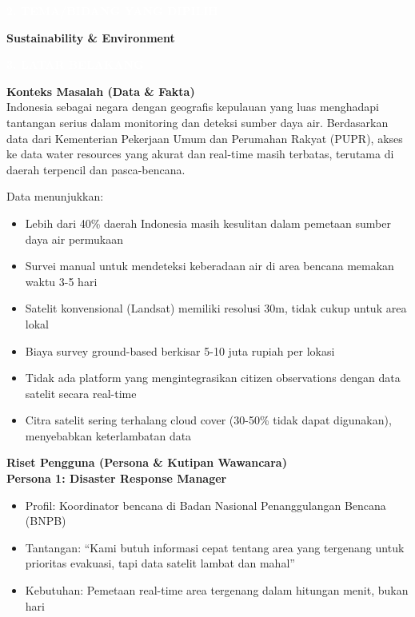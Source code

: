 \documentclass[12pt,a4paper]{article}
\newcommand{\sectionbox}[1]{%
  \colorbox{samsungblue}{%
    \parbox{\textwidth}{%
      \textcolor{white}{\large\bfseries #1}%
    }%
  }%
}
\newcommand{\subsectionbox}[1]{%
  \textbf{\large #1}\\[0.3cm]
}
\begin{document}
\vspace{1cm}

\sectionbox{2. TEMA/BIDANG YANG DIPILIH}

\vspace{0.5cm}

\textbf{Sustainability \& Environment}

\vspace{1cm}

\sectionbox{3. LATAR BELAKANG}

\vspace{0.5cm}

\subsectionbox{Konteks Masalah (Data \& Fakta)}

Indonesia sebagai negara dengan geografis kepulauan yang luas menghadapi tantangan serius dalam monitoring dan deteksi sumber daya air. Berdasarkan data dari Kementerian Pekerjaan Umum dan Perumahan Rakyat (PUPR), akses ke data water resources yang akurat dan real-time masih terbatas, terutama di daerah terpencil dan pasca-bencana.

Data menunjukkan:
\begin{itemize}
  \item Lebih dari 40\% daerah Indonesia masih kesulitan dalam pemetaan sumber daya air permukaan
  \item Survei manual untuk mendeteksi keberadaan air di area bencana memakan waktu 3-5 hari
  \item Satelit konvensional (Landsat) memiliki resolusi 30m, tidak cukup untuk area lokal
  \item Biaya survey ground-based berkisar 5-10 juta rupiah per lokasi
  \item Tidak ada platform yang mengintegrasikan citizen observations dengan data satelit secara real-time
  \item Citra satelit sering terhalang cloud cover (30-50\% tidak dapat digunakan), menyebabkan keterlambatan data
\end{itemize}

\subsectionbox{Riset Pengguna (Persona \& Kutipan Wawancara)}

\textbf{Persona 1: Disaster Response Manager}
\begin{itemize}
  \item Profil: Koordinator bencana di Badan Nasional Penanggulangan Bencana (BNPB)
  \item Tantangan: ``Kami butuh informasi cepat tentang area yang tergenang untuk prioritas evakuasi, tapi data satelit lambat dan mahal''
  \item Kebutuhan: Pemetaan real-time area tergenang dalam hitungan menit, bukan hari
\end{itemize}
\end{document}

